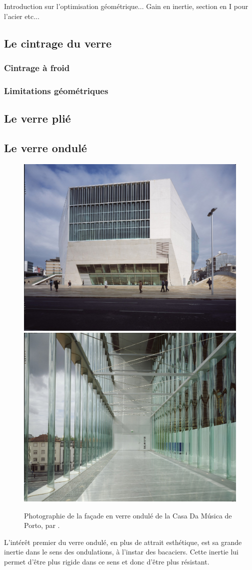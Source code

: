 \documentclass[11pt,titlepage]{article}
\begin{document}
Introduction sur l'optimisation géométrique... Gain en inertie, section en I pour l'acier etc...

\subsection{Le cintrage du verre}

\subsubsection{Cintrage à froid}

\subsubsection{Limitations géométriques}

\subsection{Le verre plié}

\subsection{Le verre ondulé}
\begin{figure}[H]
    \centering
    \includegraphics[height=0.39\textwidth]{img/ondul/casa_musica4 (1).jpg}
    \includegraphics[height=0.39\textwidth]{img/ondul/casa_musica1 (1).jpg}
    \caption{Photographie de la façade en verre ondulé de la Casa Da Música de Porto, par \cite{CasaDaMusica}.}
    \label{fig:CasaDaMusica}
\end{figure}
L'intérêt premier du verre ondulé, en plus de attrait esthétique, est sa grande inertie dans le sens des ondulations, à l'instar des bacaciers. Cette inertie lui permet d'être plus rigide dans ce sens et donc d'être plus résistant.
\end{document}
